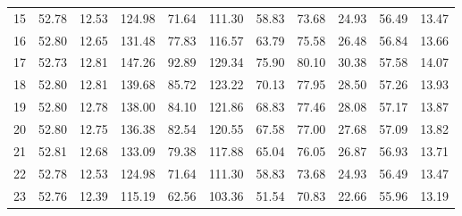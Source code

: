 \documentclass[12pt]{article}
\begin{document}
\begin{table}[h]
\begin{minipage}{\textwidth}
\begin{tabular}{crcrcrcrcrc}
15	&	52.78	&	12.53	&	124.98	&	71.64	&	111.30	&	58.83	&	73.68	&	24.93	&	56.49	&	13.47	\\
16	&	52.80	&	12.65	&	131.48	&	77.83	&	116.57	&	63.79	&	75.58	&	26.48	&	56.84	&	13.66	\\
17	&	52.73	&	12.81	&	147.26	&	92.89	&	129.34	&	75.90	&	80.10	&	30.38	&	57.58	&	14.07	\\
18	&	52.80	&	12.81	&	139.68	&	85.72	&	123.22	&	70.13	&	77.95	&	28.50	&	57.26	&	13.93	\\
19	&	52.80	&	12.78	&	138.00	&	84.10	&	121.86	&	68.83	&	77.46	&	28.08	&	57.17	&	13.87	\\
20	&	52.80	&	12.75	&	136.38	&	82.54	&	120.55	&	67.58	&	77.00	&	27.68	&	57.09	&	13.82	\\
21	&	52.81	&	12.68	&	133.09	&	79.38	&	117.88	&	65.04	&	76.05	&	26.87	&	56.93	&	13.71	\\
22	&	52.78	&	12.53	&	124.98	&	71.64	&	111.30	&	58.83	&	73.68	&	24.93	&	56.49	&	13.47	\\
23	&	52.76	&	12.39	&	115.19	&	62.56	&	103.36	&	51.54	&	70.83	&	22.66	&	55.96	&	13.19	\\
\hline
\end{tabular}
\end{minipage}
\end{table}
\end{document}
